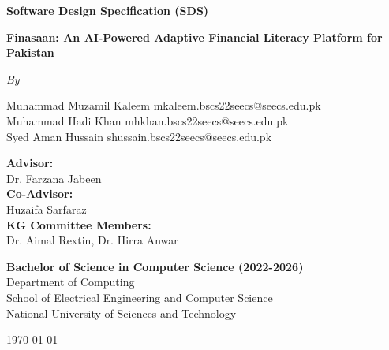 \documentclass[12pt,a4paper]{report}
\begin{document}
\begin{titlepage}
    \centering
    \vspace*{2cm}
    
    {\Huge\bfseries Software Design Specification (SDS)\par}
    \vspace{0.5cm}
    {\Huge\bfseries Finasaan: An AI-Powered Adaptive Financial Literacy Platform for Pakistan\par}
    \vspace{1cm}
    {\Large\itshape By\par}
    \vspace{1cm}
    
    {\large
    Muhammad Muzamil Kaleem \hspace{2cm} mkaleem.bscs22seecs@seecs.edu.pk\\
    Muhammad Hadi Khan \hspace{2cm} mhkhan.bscs22seecs@seecs.edu.pk\\
    Syed Aman Hussain \hspace{2cm} shussain.bscs22seecs@seecs.edu.pk\\
    }
    \vspace{2cm}
    
    {\large
    \textbf{Advisor:}\\
    Dr. Farzana Jabeen\\
    \vspace{0.5cm}
    \textbf{Co-Advisor:}\\
    Huzaifa Sarfaraz\\
    \vspace{0.5cm}
    \textbf{KG Committee Members:}\\
    Dr. Aimal Rextin, Dr. Hirra Anwar\\
    }
    \vfill
    
    {\large
    \textbf{Bachelor of Science in Computer Science (2022-2026)}\\
    \vspace{0.5cm}
    Department of Computing\\
    School of Electrical Engineering and Computer Science\\
    National University of Sciences and Technology\\
    }
    \vspace{1cm}
    
    {\large \today}
\end{titlepage}

\tableofcontents
\listoftables
\listoffigures
\listofdiagram
\end{document}
